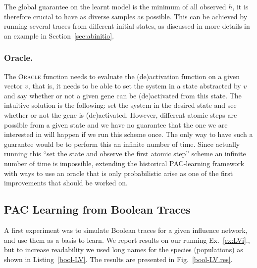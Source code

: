 \documentclass{llncs}
\begin{document}
The global guarantee on the learnt model is the minimum of all observed $h$,
it is therefore crucial to have as diverse samples as possible. This can be
achieved by running several traces from different initial states,
as discussed in more details in an example in Section~\ref{sec:abinitio}.

\subsubsection{Oracle.}
The \textsc{Oracle} function needs to evaluate the (de)activation function on a given vector $v$, that is, it needs to be able to set the system in a state abstracted by $v$ and say whether or not a given gene can be (de)activated from this state.
The intuitive solution is the following: set the system in the desired state and see whether or not the gene is (de)activated. 
However, different atomic steps are possible from a given state and we have no guarantee that the one we are interested in will happen if we run this scheme once. The only way to have such a guarantee would be to perform this an infinite number of time.
Since actually running this ``set the state and observe the first atomic step'' scheme an infinite number of time is impossible, extending the historical PAC-learning framework with ways to use an oracle that is only probabilistic arise as one of the first improvements that should be worked on.


\subsection{PAC Learning from Boolean Traces}

A first experiment was to simulate Boolean traces for a given influence network, and use them as a basis to learn.
We report results on our running
Ex.~\ref{ex:LVi}., but to increase readability we used long names for the
species (populations) as shown in Listing~\ref{bool-LV}.
The results are presented in Fig.~\ref{bool-LV.res}.
\end{document}
